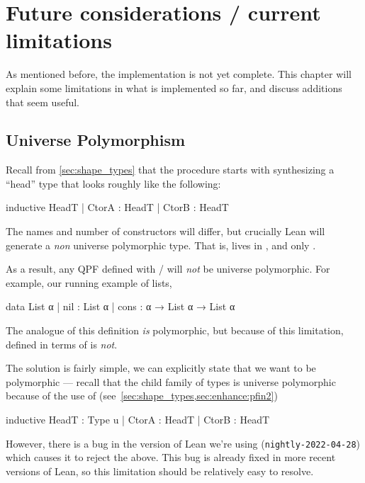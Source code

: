 
\chapter{Future considerations / current limitations}
\label{ch:limitations}


As mentioned before, the implementation is not yet complete.
This chapter will explain some limitations in what is implemented so far, and discuss
additions that seem useful.

\section{Universe Polymorphism}

Recall from \ref{sec:shape_types} that the procedure starts with synthesizing a ``head'' type that
looks roughly like the following:
\begin{leancode}
  inductive HeadT
    | CtorA : HeadT
    | CtorB : HeadT
\end{leancode}
The names and number of constructors will differ, but crucially Lean will generate a \emph{non} universe 
polymorphic type. That is,  lives in , and only .

As a result, any QPF defined with \data{}/\codata{} will \emph{not} be universe polymorphic.
For example, our running example of lists,
\begin{leancode}
  data List α 
    | nil  : List α
    | cons : α → List α → List α
\end{leancode}

The \inductive{} analogue of this definition \emph{is} polymorphic, but because of this limitation,
 defined in terms of \data{} is \emph{not}.
  

The solution is fairly simple, we can explicitly state that we want  to be polymorphic
--- recall that the child family of types is universe polymorphic because of the use of  (see~\cref{sec:shape_types,sec:enhance:pfin2})
\begin{badleancode}

  inductive HeadT : Type u
    | CtorA : HeadT
    | CtorB : HeadT

\end{badleancode}

However, there is a bug in the version of Lean we're using (\texttt{nightly-2022-04-28}) 
which causes it to reject the above. 
This bug is already fixed in more recent versions of Lean, 
so this limitation should be relatively easy to resolve.



